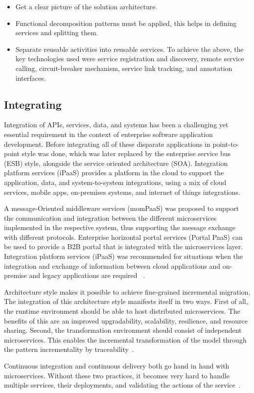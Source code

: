 \begin{itemize}
\item Get a clear picture of the solution architecture. 
\item Functional decomposition patterns must be applied, this helps in defining services and splitting them.
\item Separate reusable activities into reusable services.
To achieve the above, the key technologies used were service registration and discovery, remote service calling, circuit-breaker mechanism, service link tracking, and annotation interfaces.
\end{itemize}


\subsection{Integrating}%
Integration of APIs, services, data, and systems has been a challenging yet essential requirement in the context of enterprise software application development. Before integrating all of these disparate applications in point-to-point style was done, which was later replaced by the enterprise service bus (ESB) style, alongside the service oriented architecture (SOA).
Integration platform services (iPaaS) provides a platform in the cloud to support the application, data, and system-to-system integrations, using a mix of cloud services, mobile apps, on-premises systems, and internet of things integrations. 

\par A message-Oriented middleware services (momPaaS) was proposed to support the communication and integration between the different microservices implemented in the respective system, thus supporting the message exchange with different protocols.
Enterprise horizontal portal services (Portal PaaS) can be used to provide a B2B portal that is integrated with the microservices layer.
Integration platform services (iPaaS) was recommended for situations when the integration and exchange of information between cloud applications and on-premise and legacy applications are required ~\cite{rosa2018}.

\par Architecture style makes it possible to achieve fine-grained incremental migration. The integration of this architecture style manifests itself in two ways. First of all, the runtime environment should be able to host distributed microservices. The benefits of this are an improved upgradability, scalability, resilience, and resource sharing.
Second, the transformation environment should consist of independent microservices. This enables the incremental transformation of the model through the pattern incrementality by traceability~\cite{liu2018, overeem2018}.

\par Continuous integration and continuous delivery both go hand in hand with microservices. Without these two practices, it becomes very hard to handle multiple services, their deployments, and validating the actions of the service~\cite{Zhang2019, Kalske2017}. 





